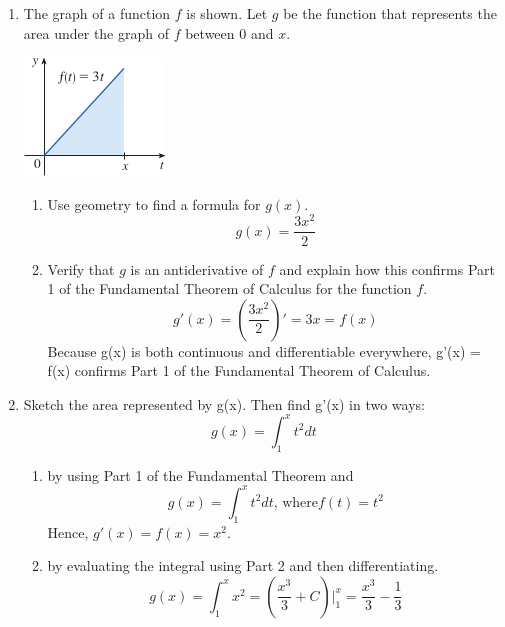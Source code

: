 \documentclass[12pt]{article}
\begin{document}
\begin{enumerate}
\begin{enumerate}
\begin{center}
        \end{center}
    \end{enumerate}
\newpage
\setcounter{enumi}{5}
    \item The graph of a function $f$ is shown. Let $g$ be the function that represents the area under the graph of $f$ between 0 and $x$.
    \begin{center}
        \includegraphics{img/img-1.png}
    \end{center}
    \begin{enumerate}
        \item Use geometry to find a formula for $g(x)$.
        \[g(x) = \frac{3x^2}{2}\]
        \item Verify that $g$ is an antiderivative of $f$ and explain how this confirms Part 1 of the Fundamental Theorem of Calculus for the function $f$.
        \[g'(x) = (\frac{3x^2}{2})'= 3x = f(x)\]
        Because g(x) is both continuous and differentiable everywhere, g'(x) = f(x) confirms Part 1 of the Fundamental Theorem of Calculus.
    \end{enumerate}
    \item Sketch the area represented by g(x). Then find g'(x) in two ways:
    \[g(x) = \int_{1}^{x} t^2dt\]
    \begin{enumerate}
        \item by using Part 1 of the Fundamental Theorem and
        \[g(x) = \int_{1}^{x} t^2dt \text{, where} f(t) = t^2\]
        Hence, $g'(x) = f(x) = x^2$.
        \item by evaluating the integral using Part 2 and then differentiating.
        \[g(x) = \int_{1}^{x} x^2 = (\frac{x^3}{3} + C)|_1^x = \frac{x^3}{3} - \frac{1}{3}\]

\end{enumerate}
\end{enumerate}
\end{document}
